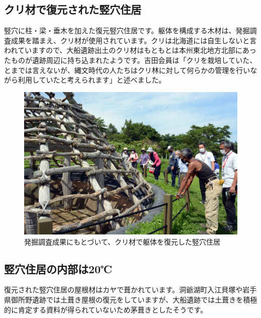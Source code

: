 \documentclass[a4j,11pt,twocolumn,openany]{jsbook}
\begin{document}
\subsection{クリ材で復元された竪穴住居}

竪穴に柱・梁・垂木を加えた復元竪穴住居です。躯体を構成する木材は、発掘調査成果を踏まえ、クリ材が使用されています。クリは北海道には自生しないと言われていますので、大船遺跡出土のクリ材はもともとは本州東北地方北部にあったものが遺跡周辺に持ち込まれたようです。吉田会員は「クリを栽培していた、とまでは言えないが、縄文時代の人たちはクリ林に対して何らかの管理を行いながら利用していたと考えられます」と述べました。

\begin{figure}[ht]
	\centering
	\includegraphics[width=\linewidth]{fig/01_Iseki_kengaku/04_Ofune_house.JPG}
	\caption{
		発掘調査成果にもとづいて、クリ材で躯体を復元した竪穴住居}
	\label{}
\end{figure}

\subsection{竪穴住居の内部は20℃}

復元された竪穴住居の屋根材はカヤで葺かれています。洞爺湖町入江貝塚や岩手県御所野遺跡では土葺き屋根の復元をしていますが、大船遺跡では土葺きを積極的に肯定する資料が得られていないため茅葺きとしたそうです。
\end{document}
